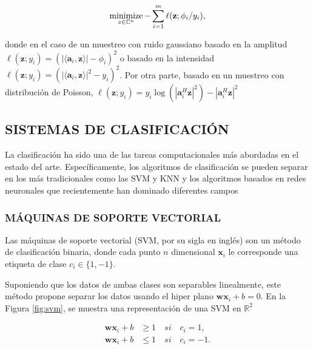 \begin{itemize}
    \begin{equation}
        \operatorname*{minimize}_{z \in \mathbb{C}^{n}} -\sum_{i=1}^{m} \ell(\mathbf{z};\phi_i/y_i),
    \end{equation}
    
    donde en el caso de un muestreo con ruido gaussiano basado en la amplitud $\ell(\mathbf{z};y_i) = (\vert \langle \mathbf{a}_i,\mathbf{z}\rangle \vert - \phi_i)^2$ o basado en la intensidad  $\ell(\mathbf{z};y_i) = (\vert \langle \mathbf{a}_i,\mathbf{z}\rangle \vert^2 - y_i)^2$. Por otra parte, basado en un muestreo con distribución de Poisson, $\ell(\mathbf{z};y_i) = { y_i \log(|\mathbf{a}_i^H \mathbf{z}|^2) -|\mathbf{a}_i^H \mathbf{z}|^2 }$ 
\end{itemize}





\subsection{SISTEMAS DE CLASIFICACIÓN}

La clasificación ha sido una de las tareas computacionales más abordadas en el estado del arte. Específicamente, los algoritmos de clasificación se pueden separar en los más tradicionales como las SVM y KNN \cite{kim12012comparing} y los algoritmos basados en redes neuronales que recientemente han dominado diferentes campos \cite{li2019deep,li2018deep, wang2019development}
\subsubsection{MÁQUINAS DE SOPORTE VECTORIAL}
Las máquinas de soporte vectorial (SVM, por su sigla en inglés) \cite{suthaharan2016support} son un método de clasificación binaria, donde cada punto $n$ dimensional $\mathbf{x}_i$ le corresponde una etiqueta de clase $c_i \in \{1,-1\}$.

Suponiendo que los datos de ambas clases son separables linealmente, este método propone separar los datos usando el hiper plano $\mathbf{w}\mathbf{x}_i + b = 0$. En la Figura \ref{fig:svm}, se muestra una representación de una SVM en $\mathbb{R}^2$

\begin{equation}
    \begin{split}
        \mathbf{w}\mathbf{x}_i + b &\geq 1 \quad si \quad c_i=1, \\
        \mathbf{w}\mathbf{x}_i + b &\leq 1 \quad si \quad c_i=-1.
    \end{split}
\end{equation}

